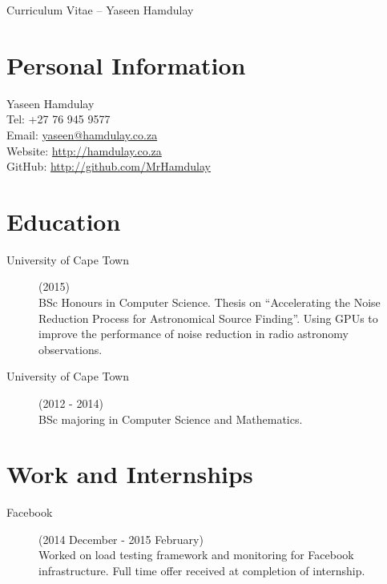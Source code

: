 \documentclass[margin,line,a4paper]{resume}
\begin{document}
    {\sc \Large Curriculum Vitae -- Yaseen Hamdulay}
    \begin{resume}
        \vspace{0.5cm}

        \section{\mysidestyle Personal Information}
            Yaseen Hamdulay\\
            Tel: +27 76 945 9577\\
            Email: \href{mailto:yaseen@hamdulay.co.za}{yaseen@hamdulay.co.za}\\
            Website: \href{http://hamdulay.co.za}{http://hamdulay.co.za}\\
            GitHub: \href{http://github.com/MrHamdulay}{http://github.com/MrHamdulay}\\

        \section{\mysidestyle Education}
            \begin{description}
                \item[University of Cape Town] (2015) \\
                    BSc Honours in Computer Science. Thesis on ``Accelerating the Noise Reduction Process for Astronomical Source Finding''.
                    Using GPUs to improve the performance of noise reduction in radio astronomy observations.

                \item[University of Cape Town] (2012 - 2014) \\
                    BSc majoring in Computer Science and Mathematics.
            \end{description}


        \section{\mysidestyle Work and Internships}
            \begin{description}
                \item[Facebook] (2014 December - 2015 February) \\
                    Worked on load testing framework and monitoring for Facebook infrastructure.
                    Full time offer received at completion of internship.


\end{description}
\end{resume}
\end{document}
